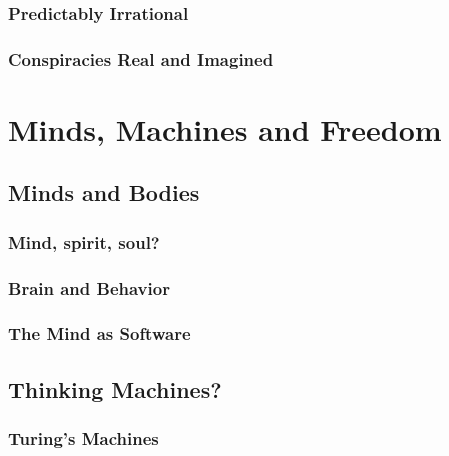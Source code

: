 \documentclass[
  12pt, openany]{book}
\begin{document}
\hypertarget{predictably-irrational}{%
\subsection{Predictably Irrational}\label{predictably-irrational}}

\hypertarget{conspiracies-real-and-imagined}{%
\subsection{Conspiracies Real and Imagined}\label{conspiracies-real-and-imagined}}

\hypertarget{minds-machines-and-freedom}{%
\chapter{Minds, Machines and Freedom}\label{minds-machines-and-freedom}}

\hypertarget{minds-and-bodies}{%
\section{Minds and Bodies}\label{minds-and-bodies}}

\hypertarget{mind-spirit-soul}{%
\subsection{Mind, spirit, soul?}\label{mind-spirit-soul}}

\hypertarget{brain-and-behavior}{%
\subsection{Brain and Behavior}\label{brain-and-behavior}}

\hypertarget{the-mind-as-software}{%
\subsection{The Mind as Software}\label{the-mind-as-software}}

\hypertarget{thinking-machines}{%
\section{Thinking Machines?}\label{thinking-machines}}

\hypertarget{turings-machines}{%
\subsection{Turing's Machines}\label{turings-machines}}
\end{document}
